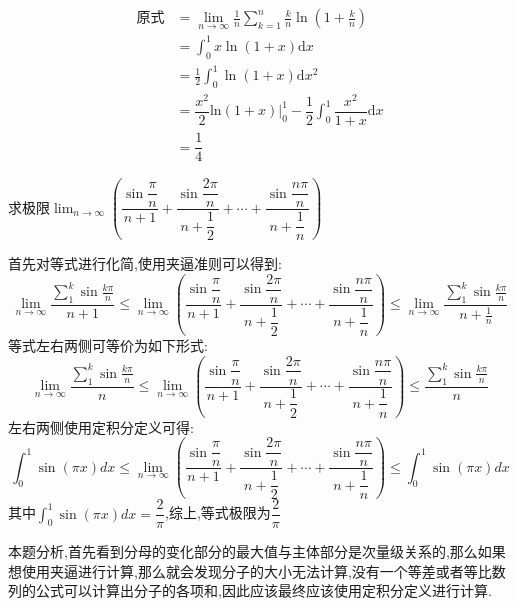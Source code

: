 \documentclass[8pt a4paper, oneside, UTF8]{ctexbook}
\begin{document}
\begin{sloppypar}
\begin{problem}
    \end{problem}
    \begin{solution}
        \begin{align*}
          \text{原式} & =\lim_{n\to\infty}\frac1n\sum_{k=1}^n\frac kn\ln\left(1+\frac kn\right)\\
          & = \int_0^1x\ln(1+x)\mathrm{d}x\\
          & = \frac12\int_0^1\ln\left(1+x\right)\mathrm{d}x^2\\
          & =\dfrac{x^2}2\mathrm{ln}(1+x)\Bigg|_0^1-\dfrac12\int_0^1\dfrac{x^2}{1+x}\mathrm{d}x  \\
          & = \dfrac{1}{4}
        \end{align*}
    \end{solution}
    \begin{problem}
        求极限$\lim_{n\to\infty}\left(\dfrac{\sin\dfrac\pi n}{n+1}+\dfrac{\sin\dfrac{2\pi}n}{n+\dfrac12}+\cdots+\dfrac{\sin\dfrac{n\pi}n}{n+\dfrac1n}\right)$
    \end{problem}
    \begin{solution}
        首先对等式进行化简,使用夹逼准则可以得到:
        $$
        \lim_{n \to \infty}\dfrac{\sum_{1}^{k}\sin \frac{k \pi}{n}}{n+1} \leqslant \lim_{n\to\infty}\left(\dfrac{\sin\dfrac\pi n}{n+1}+\dfrac{\sin\dfrac{2\pi}n}{n+\dfrac12}+\cdots+\dfrac{\sin\dfrac{n\pi}n}{n+\dfrac1n}\right) \leqslant \lim_{n\to \infty}\dfrac{\sum_{1}^{k} \sin\frac{k \pi}{n}}{n+\frac1n}
        $$
        等式左右两侧可等价为如下形式:
        $$
        \lim_{n \to \infty}\dfrac{\sum_{1}^{k}\sin \frac{k \pi}{n}}{n} \leqslant \lim_{n\to\infty}\left(\dfrac{\sin\dfrac\pi n}{n+1}+\dfrac{\sin\dfrac{2\pi}n}{n+\dfrac12}+\cdots+\dfrac{\sin\dfrac{n\pi}n}{n+\dfrac1n}\right) \leqslant \dfrac{\sum_{1}^{k}\sin \frac{k \pi}{n}}{n}
        $$
        左右两侧使用定积分定义可得:
        $$
            \int_0 ^1 \sin (\pi x) dx \leqslant \lim_{n\to\infty}\left(\dfrac{\sin\dfrac\pi n}{n+1}+\dfrac{\sin\dfrac{2\pi}n}{n+\dfrac12}+\cdots+\dfrac{\sin\dfrac{n\pi}n}{n+\dfrac1n}\right) \leqslant \int_0 ^1 \sin (\pi x) dx
        $$
        其中$\int_0 ^1 \sin (\pi x) dx=\dfrac{2}{\pi}$,综上,等式极限为$\dfrac{2}{\pi}$
    \end{solution}
    \begin{note}
        本题分析,首先看到分母的变化部分的最大值与主体部分是次量级关系的,那么如果想使用夹逼进行计算,那么就会发现分子的大小无法计算,没有一个等差或者等比数列的公式可以计算出分子的各项和,因此应该最终应该使用定积分定义进行计算.
    \end{note}

\end{sloppypar}
\end{document}
